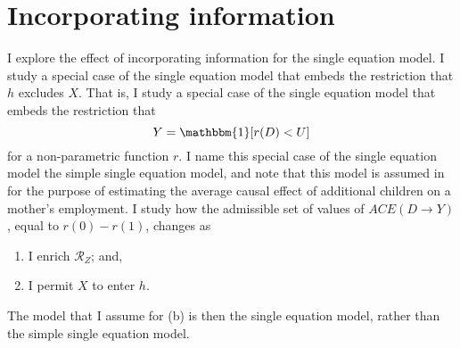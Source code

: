 \documentclass[10pt,a4paper,twoside]{article}
\DeclareRobustCommand{\stirling}{\genfrac\{\}{0pt}{}}
\numberwithin{equation}{section}
\begin{document}
\section{Incorporating information}
I explore the effect of incorporating information for the single equation model. I study a special case of the single equation model that embeds the restriction that $h$ excludes $X$. That is, I study a special case of the single equation model that embeds the restriction that 
\[Y=\mathbbm{1}[r(D)<U]\]
for a non-parametric function $r$. I name this special case of the single equation model the simple single equation model, and note that this model is assumed in \cite{cr13} for the purpose of estimating the average causal effect of additional children on a mother's employment. I study how the admissible set of values of $ACE(D\rightarrow Y)$, equal to $r(0)-r(1)$, changes as 
\begin{enumerate}[(a.)]
\item I enrich $\mathcal{R}_Z$; and,
\item I permit $X$ to enter $h$.
\end{enumerate}
The model that I assume for (b) is then the single equation model, rather than the simple single equation model. 
\end{document}
